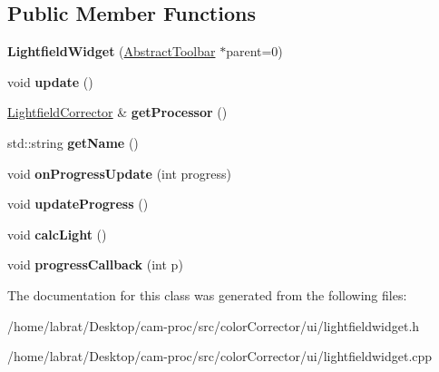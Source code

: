 \subsection*{Public Member Functions}
\begin{DoxyCompactItemize}
\item 
{\bfseries Lightfield\+Widget} (\hyperlink{classAbstractToolbar}{Abstract\+Toolbar} $\ast$parent=0)\hypertarget{classLightfieldWidget_ad3ffa7a60e19da469a17038fd24f3fee}{}\label{classLightfieldWidget_ad3ffa7a60e19da469a17038fd24f3fee}

\item 
void {\bfseries update} ()\hypertarget{classLightfieldWidget_a06a0b39dbd125a63c9434de22b22dcb1}{}\label{classLightfieldWidget_a06a0b39dbd125a63c9434de22b22dcb1}

\item 
\hyperlink{classLightfieldCorrector}{Lightfield\+Corrector} \& {\bfseries get\+Processor} ()\hypertarget{classLightfieldWidget_aa4a167773d494db6ff2fa248cd45c072}{}\label{classLightfieldWidget_aa4a167773d494db6ff2fa248cd45c072}

\item 
std\+::string {\bfseries get\+Name} ()\hypertarget{classLightfieldWidget_a34c7fbf97fe0def91db5ea5059989af0}{}\label{classLightfieldWidget_a34c7fbf97fe0def91db5ea5059989af0}

\item 
void {\bfseries on\+Progress\+Update} (int progress)\hypertarget{classLightfieldWidget_a8b53aacacbd981a4ded45600407a165e}{}\label{classLightfieldWidget_a8b53aacacbd981a4ded45600407a165e}

\item 
void {\bfseries update\+Progress} ()\hypertarget{classLightfieldWidget_a7f0dc3d73963f754f3b3d12445e981ba}{}\label{classLightfieldWidget_a7f0dc3d73963f754f3b3d12445e981ba}

\item 
void {\bfseries calc\+Light} ()\hypertarget{classLightfieldWidget_a49357ff36af4f2dcc0435a33af5d3b25}{}\label{classLightfieldWidget_a49357ff36af4f2dcc0435a33af5d3b25}

\item 
void {\bfseries progress\+Callback} (int p)\hypertarget{classLightfieldWidget_a44d5a59889898b55528aa13ac15e0e8d}{}\label{classLightfieldWidget_a44d5a59889898b55528aa13ac15e0e8d}

\end{DoxyCompactItemize}


The documentation for this class was generated from the following files\+:\begin{DoxyCompactItemize}
\item 
/home/labrat/\+Desktop/cam-\/proc/src/color\+Corrector/ui/lightfieldwidget.\+h\item 
/home/labrat/\+Desktop/cam-\/proc/src/color\+Corrector/ui/lightfieldwidget.\+cpp\end{DoxyCompactItemize}
